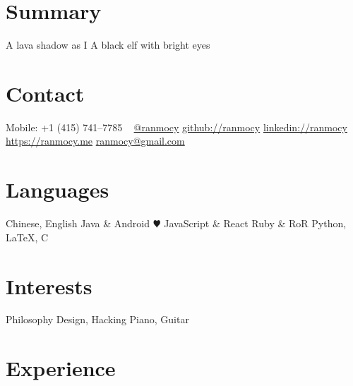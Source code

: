 \documentclass[]{friggeri-cv} %
\begin{document}


\begin{aside} %
  \section{Summary}
  A lava shadow as I
  A black elf
  with bright eyes
  \section{Contact}
  Mobile:
  +1 (415) 741--7785
  ~
  \href{https://twitter.com/ranmocy}{@ranmocy}
  \href{https://github.com/ranmocy}{github://ranmocy}
  \href{https://www.linkedin.com/in/ranmocy}{linkedin://ranmocy}
  \href{https://ranmocy.me}{https://ranmocy.me}
  \href{mailto:ranmocy+cv@gmail.com}{ranmocy@gmail.com}
  \section{Languages}
  Chinese, English
  Java \& Android {\color{red} $\varheartsuit$}
  JavaScript \& React
  Ruby \& RoR
  Python, LaTeX, C
  \section{Interests}
  Philosophy
  Design, Hacking
  Piano, Guitar
\end{aside}


\section{Experience}
\end{document}
